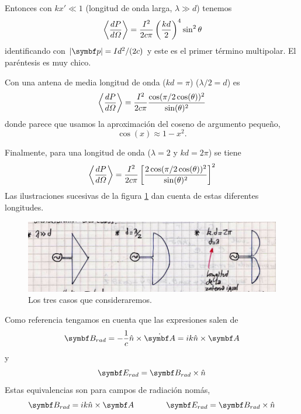 \documentclass[10pt,oneside]{CBFT_book}
\begin{document}
Entonces con $ kx' \ll 1$ (longitud de onda larga, $\lambda \gg d $) tenemos
\[
	\:\left\langle  \frac{d^{\hspace{-0.05em}} {P}}{d {\Omega}^{\hspace{-0.05em}}}  \right\rangle = \frac{I^2}{2c\pi} \left( \frac{ kd }{ 2 } \right)^4 \sin^2 \theta
\]
identificando con $|\vb{p}| = Id^2/(2c)$ y este es el primer término multipolar.
El paréntesis es muy chico.

Con una antena de media longitud de onda ($kd=\pi$) ($\lambda/2=d$) es
\[
	\left\langle\frac{d^{\hspace{-0.05em}} {P}}{d {\Omega}^{\hspace{-0.05em}}}\right\rangle=\frac{I^2}{2c\pi}\frac{\cos(\pi/2 
	\cos(\theta))^2}{\sin(\theta)^2}
\]
donde parece que usamos la aproximación del coseno de argumento pequeño,
\[
	\cos(x) \approx 1 - x^2.
\]

Finalmente, para una longitud de onda ($\lambda=2$ y $kd=2\pi$) se tiene 
\[
	\left\langle\frac{d^{\hspace{-0.05em}} {P}}{d {\Omega}^{\hspace{-0.05em}}}\right\rangle=\frac{I^2}{2c\pi} \left[ \frac{ 2\cos(\pi/2 
	\cos(\theta))^2}{\sin(\theta)^2} \right]^2
\]
Las ilustraciones sucesivas de la figura \ref{fig_ft1_antena3} dan cuenta de estas diferentes longitudes.

\begin{figure}[htb]
	\begin{center}
	\includegraphics[width=1.0\textwidth]{images/fig_ft1_antena3.jpg}	 
	\end{center}
	\caption{Los tres casos que consideraremos.}
	\label{fig_ft1_antena3}
\end{figure} 


Como referencia tengamos en cuenta que las expresiones salen de 
\[
	\vb{B}_{rad} = -\frac{1}{c} \hat{n} \times \dot{\vb{A}} = ik \hat{n} \times \vb{A} 
\]
y
\[
	\vb{E}_{rad} = \vb{B}_{rad} \times \hat{n}
\]
Estas equivalencias son para campos de radiación nomás,
\[
	\vb{B}_{rad} = ik \hat{n} \times \vb{A} \qquad \qquad \vb{E}_{rad} = \vb{B}_{rad} \times \hat{n}
\]
\end{document}

